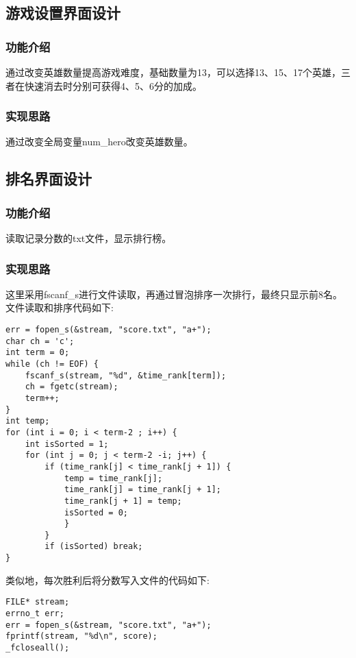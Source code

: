 \subsection{游戏设置界面设计}
\subsubsection{功能介绍}
通过改变英雄数量提高游戏难度，基础数量为13，可以选择13、15、17个英雄，三者在快速消去时分别可获得4、5、6分的加成。


\subsubsection{实现思路}
通过改变全局变量num\_hero改变英雄数量。

\subsection{排名界面设计}
\subsubsection{功能介绍}
读取记录分数的txt文件，显示排行榜。

\subsubsection{实现思路}
这里采用fscanf\_s进行文件读取，再通过冒泡排序一次排行，最终只显示前8名。文件读取和排序代码如下:
\lstset{language=C}
\begin{lstlisting}
err = fopen_s(&stream, "score.txt", "a+");
char ch = 'c';
int term = 0;
while (ch != EOF) {
    fscanf_s(stream, "%d", &time_rank[term]);
    ch = fgetc(stream);
    term++;
}
int temp;
for (int i = 0; i < term-2 ; i++) {
    int isSorted = 1; 
    for (int j = 0; j < term-2 -i; j++) {
        if (time_rank[j] < time_rank[j + 1]) {
            temp = time_rank[j];
            time_rank[j] = time_rank[j + 1];
            time_rank[j + 1] = temp;
            isSorted = 0; 
            }
        }
        if (isSorted) break;
}
\end{lstlisting}

类似地，每次胜利后将分数写入文件的代码如下:
\lstset{language=C}
\begin{lstlisting}
FILE* stream;
errno_t err;
err = fopen_s(&stream, "score.txt", "a+");
fprintf(stream, "%d\n", score);
_fcloseall();
\end{lstlisting}




